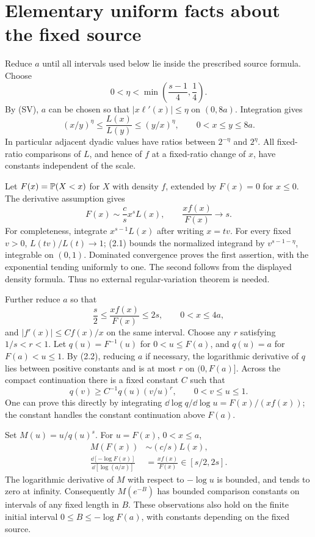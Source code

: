 \section{Elementary uniform facts about the fixed source}
Reduce $a$ until all intervals used below lie inside the prescribed source formula. Choose
\[
 0<\eta<\min\left(\frac{s-1}{4},\frac14\right).
\]
By (SV), $a$ can be chosen so that $|x\ell'(x)|\le\eta$ on $(0,8a)$. Integration gives
\begin{equation}
 (x/y)^\eta\le\frac{L(x)}{L(y)}\le(y/x)^\eta,
 \qquad0<x\le y\le8a.\tag{2.1}
\end{equation}
In particular adjacent dyadic values have ratios between $2^{-\eta}$ and $2^\eta$. All fixed-ratio comparisons of $L$, and hence of $f$ at a fixed-ratio change of $x$, have constants independent of the scale.

Let $F(x)=\mathbb P(X<x)$ for $X$ with density $f$, extended by $F(x)=0$ for $x\le0$. The derivative assumption gives
\begin{equation}
 F(x)\sim\frac cs x^sL(x),\qquad \frac{xf(x)}{F(x)}\longrightarrow s.
 \tag{2.2}
\end{equation}
For completeness, integrate $x^{s-1}L(x)$ after writing $x=tv$. For every fixed $v>0$, $L(tv)/L(t)\to1$; (2.1) bounds the normalized integrand by $v^{s-1-\eta}$, integrable on $(0,1)$. Dominated convergence proves the first assertion, with the exponential tending uniformly to one. The second follows from the displayed density formula. Thus no external regular-variation theorem is needed.

Further reduce $a$ so that
\begin{equation}
 \frac s2\le\frac{xf(x)}{F(x)}\le2s,\qquad0<x\le4a,\tag{2.3}
\end{equation}
 and $|f'(x)|\le C f(x)/x$ on the same interval. Choose any $r$ satisfying $1/s<r<1$. Let $q(u)=F^{-1}(u)$ for $0<u\le F(a)$, and $q(u)=a$ for $F(a)<u\le1$. By (2.2), reducing $a$ if necessary, the logarithmic derivative of $q$ lies between positive constants and is at most $r$ on $(0,F(a)]$. Across the compact continuation there is a fixed constant $C$ such that
\begin{equation}
 q(v)\ge C^{-1}q(u)(v/u)^r,\qquad0<v\le u\le1.\tag{2.4}
\end{equation}
One can prove this directly by integrating $\dd\log q/\dd\log u=F(x)/(xf(x))$; the constant handles the constant continuation above $F(a)$.

Set $M(u)=u/q(u)^s$. For $u=F(x)$, $0<x\le a$,
\begin{align}
 M(F(x))&\sim(c/s)L(x),\tag{2.5}\\
 \frac{\dd[-\log F(x)]}{\dd[\log(a/x)]}
 &=\frac{xf(x)}{F(x)}\in[s/2,2s].\tag{2.6}
\end{align}
The logarithmic derivative of $M$ with respect to $-\log u$ is bounded, and tends to zero at infinity. Consequently $M(e^{-B})$ has bounded comparison constants on intervals of any fixed length in $B$. These observations also hold on the finite initial interval $0\le B\le-\log F(a)$, with constants depending on the fixed source.

